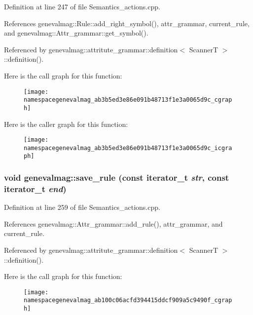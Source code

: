 Definition at line 247 of file Semantics\_\-actions.cpp.



References genevalmag::Rule::add\_\-right\_\-symbol(), attr\_\-grammar, current\_\-rule, and genevalmag::Attr\_\-grammar::get\_\-symbol().



Referenced by genevalmag::attritute\_\-grammar::definition$<$ ScannerT $>$::definition().



Here is the call graph for this function:\nopagebreak
\begin{figure}[H]
\begin{center}
\leavevmode
\texttt{[image: namespacegenevalmag\_ab3b5ed3e86e091b48713f1e3a0065d9c\_cgraph]}
\end{center}
\end{figure}




Here is the caller graph for this function:\nopagebreak
\begin{figure}[H]
\begin{center}
\leavevmode
\texttt{[image: namespacegenevalmag\_ab3b5ed3e86e091b48713f1e3a0065d9c\_icgraph]}
\end{center}
\end{figure}


\hypertarget{namespacegenevalmag_ab100c06acfd394415ddcf909a5c9490f}{
\subsubsection[{save\_\-rule}]{\setlength{\rightskip}{0pt plus 5cm}void genevalmag::save\_\-rule (const iterator\_\-t {\em str}, \/  const iterator\_\-t {\em end})}}
\label{namespacegenevalmag_ab100c06acfd394415ddcf909a5c9490f}


Definition at line 259 of file Semantics\_\-actions.cpp.



References genevalmag::Attr\_\-grammar::add\_\-rule(), attr\_\-grammar, and current\_\-rule.



Referenced by genevalmag::attritute\_\-grammar::definition$<$ ScannerT $>$::definition().



Here is the call graph for this function:\nopagebreak
\begin{figure}[H]
\begin{center}
\leavevmode
\texttt{[image: namespacegenevalmag\_ab100c06acfd394415ddcf909a5c9490f\_cgraph]}
\end{center}
\end{figure}




